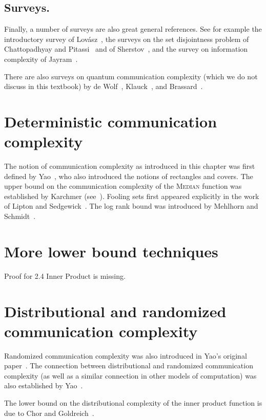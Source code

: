 \subsection*{Surveys.}
Finally, a number of surveys are also great general references. See for example the introductory survey of Lov{\'a}sz~\cite{Lovasz89}, the surveys on the set disjointness problem of Chattopadhyay and Pitassi~\cite{ChattopadhyayP10} and of Sherstov~\cite{Sherstov14}, and the survey on information complexity of Jayram~\cite{Jayram10}. 

There are also surveys on quantum communication complexity (which we do not discuss in this textbook) by de Wolf~\cite{deWolf02}, Klauck~\cite{Klauck00}, and Brassard~\cite{Brassard04}.


\section{Deterministic communication complexity}

The notion of communication complexity as introduced in this chapter was first defined by Yao~\cite{Yao79}, who also introduced the notions of rectangles and covers. The upper bound on the communication complexity of the \textsc{Median} function was established by Karchmer (see~\cite[\S 1.5]{KushilevitzN97}).
Fooling sets first appeared explicitly in the work of Lipton and Sedgewick~\cite{LiptonS81}.
The log rank bound was introduced by Mehlhorn and Schmidt~\cite{MehlhornS82}.

\section{More lower bound techniques}

Proof for 2.4 Inner Product is missing.

\section{Distributional and randomized communication complexity}

Randomized communication complexity was also introduced in Yao's original paper~\cite{Yao79}. The connection between distributional and randomized communication complexity (as well as a similar connection in other models of computation) was also established by Yao~\cite{Yao83}. 

The lower bound on the distributional complexity of the inner product function is due to Chor and Goldreich~\cite{ChorG85}.


